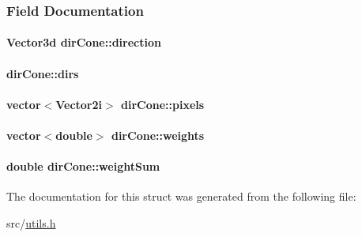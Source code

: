\subsubsection{\-Field \-Documentation}
\hypertarget{structdirCone_ad89d1fbdcde77400f608cdb1f502842d}{
\paragraph[{direction}]{\setlength{\rightskip}{0pt plus 5cm}\-Vector3d {\bf dir\-Cone\-::direction}}}\label{structdirCone_ad89d1fbdcde77400f608cdb1f502842d}
\hypertarget{structdirCone_ae7bfc1b6c2a55a772e2f6d009dac449d}{
\paragraph[{dirs}]{ {\bf dir\-Cone\-::dirs}}}\label{structdirCone_ae7bfc1b6c2a55a772e2f6d009dac449d}
\hypertarget{structdirCone_ae420701e1029a65d9b79998247985a02}{
\paragraph[{pixels}]{\setlength{\rightskip}{0pt plus 5cm}vector$<$\-Vector2i$>$ {\bf dir\-Cone\-::pixels}}}\label{structdirCone_ae420701e1029a65d9b79998247985a02}
\hypertarget{structdirCone_a4771a6176536f25c585f664b76d69da0}{
\paragraph[{weights}]{\setlength{\rightskip}{0pt plus 5cm}vector$<$double$>$ {\bf dir\-Cone\-::weights}}}\label{structdirCone_a4771a6176536f25c585f664b76d69da0}
\hypertarget{structdirCone_a36ba2b6825f43391cac3e7096fc912a9}{
\paragraph[{weight\-Sum}]{\setlength{\rightskip}{0pt plus 5cm}double {\bf dir\-Cone\-::weight\-Sum}}}\label{structdirCone_a36ba2b6825f43391cac3e7096fc912a9}


\-The documentation for this struct was generated from the following file\-:\begin{DoxyCompactItemize}
\item 
src/\hyperlink{utils_8h}{utils.\-h}\end{DoxyCompactItemize}
